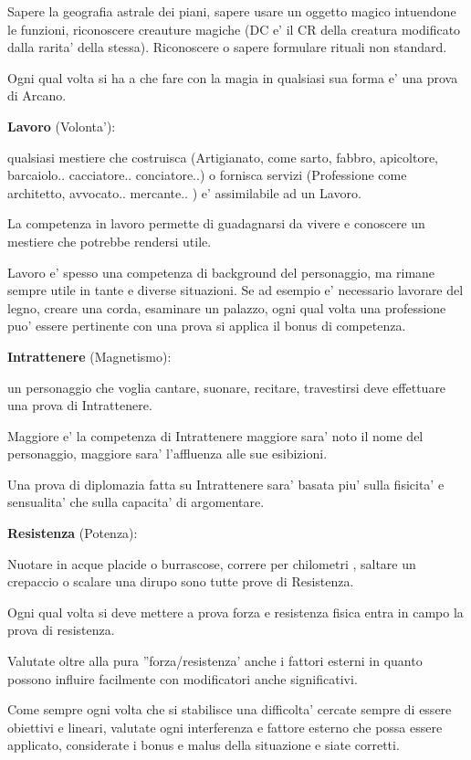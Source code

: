 \documentclass[a4paper,11pt,twoside,openany]{book}
\begin{document}
Sapere la geografia astrale dei piani, sapere usare un oggetto magico intuendone le funzioni, riconoscere creauture magiche (DC e' il CR della creatura modificato dalla rarita' della stessa). Riconoscere o sapere formulare rituali non standard.

Ogni qual volta si ha a che fare con la magia in qualsiasi sua forma e' una prova di Arcano.

\textbf{Lavoro} (Volonta'):

qualsiasi mestiere che costruisca (Artigianato, come sarto, fabbro, apicoltore, barcaiolo.. cacciatore.. conciatore..) o fornisca servizi (Professione come architetto, avvocato.. mercante.. ) e' assimilabile ad un Lavoro.

La competenza in lavoro permette di guadagnarsi da vivere e conoscere un mestiere che potrebbe rendersi utile.

Lavoro e' spesso una competenza di background del personaggio, ma rimane sempre utile in tante e diverse situazioni. Se ad esempio e' necessario lavorare del legno, creare una corda, esaminare un palazzo, ogni qual volta una professione puo' essere pertinente con una prova si applica il bonus di competenza.

\textbf{Intrattenere} (Magnetismo):

un personaggio che voglia cantare, suonare, recitare, travestirsi deve effettuare una prova di Intrattenere.

Maggiore e' la competenza di Intrattenere maggiore sara' noto il nome del personaggio, maggiore sara' l'affluenza alle sue esibizioni.

Una prova di diplomazia fatta su Intrattenere sara' basata piu' sulla fisicita' e sensualita' che sulla capacita' di argomentare.

\textbf{Resistenza} (Potenza):

Nuotare in acque placide o burrascose, correre per chilometri , saltare un crepaccio o scalare una dirupo sono tutte prove di Resistenza.

Ogni qual volta si deve mettere a prova forza e resistenza fisica entra in campo la prova di resistenza.

Valutate oltre alla pura ''forza/resistenza' anche i fattori esterni in quanto possono influire facilmente con modificatori anche significativi.

\bigskip

Come sempre ogni volta che si stabilisce una difficolta' cercate sempre di essere obiettivi e lineari, valutate ogni interferenza e fattore esterno che possa essere applicato, considerate i bonus e malus della situazione e siate corretti.
\end{document}
